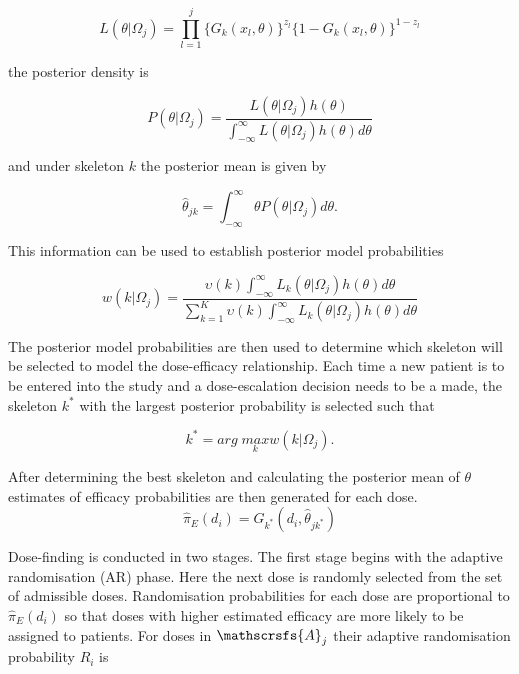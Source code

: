 \begin{equation}
L(\theta|\Omega_j)=\prod_{l=1}^{j}\{G_k(x_l,\theta)\}^{z_l}\{1-G_k(x_l,\theta)\}^{1-z_l}  
\end{equation}

the posterior density is 

\begin{equation}
P(\theta|\Omega_j) = \frac{L(\theta|\Omega_j)h(\theta)}{\int_{-\infty}^{\infty}L(\theta|\Omega_j)h(\theta)d\theta}
\end{equation}

and under skeleton $k$ the posterior mean is given by 

\begin{equation}
\hat{\theta}_{jk} = \int_{-\infty}^{\infty}\theta P(\theta|\Omega_j)d\theta.
\end{equation} 

This information can be used to establish posterior model probabilities 

\begin{equation}
w(k|\Omega_j) = \frac{\upsilon(k)\int_{-\infty}^{\infty}L_k(\theta|\Omega_j)h(\theta)d\theta}{\sum_{k=1}^{K}\upsilon(k)\int_{-\infty}^{\infty}L_k(\theta|\Omega_j)h(\theta)d\theta}
\end{equation}

The posterior model probabilities are then used to determine which skeleton will be selected to model the dose-efficacy relationship. Each time a new patient is to be entered into the study and a dose-escalation decision needs to be a made, the skeleton $k^*$ with the largest posterior probability is selected such that

\begin{equation}
k^* = arg \; \underset{k}{max}w(k|\Omega_j).
\end{equation}

After determining the best skeleton and calculating the posterior mean of $\theta$ estimates of efficacy probabilities are then generated for each dose. 
\begin{equation}
\hat{\pi}_E(d_i) = G_{k^*} (d_i, \hat{\theta}_{jk^*})
\end{equation}

Dose-finding is conducted in two stages. The first stage begins with the adaptive randomisation (AR) phase. Here the next dose is randomly selected from the set of admissible doses. Randomisation probabilities for each dose are proportional to $\hat{\pi}_E(d_i)$ so that doses with higher estimated efficacy are more likely to be assigned to patients. For doses in $\mathscrsfs{A}_j$ their adaptive randomisation probability $R_i$ is 

